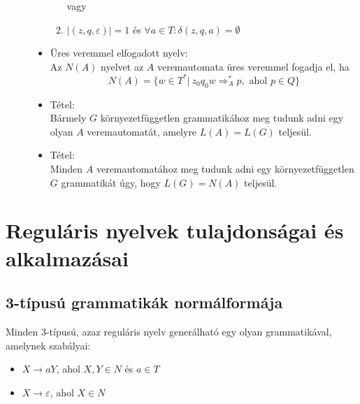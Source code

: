 \documentclass[margin=0px]{article}
\begin{document}
\begin{description}
\begin{itemize}
\begin{enumerate}
                            vagy
                      \item $|(z, q, \varepsilon)| = 1 $ és $\forall a \in T: \delta(z, q, a) = \emptyset$
                  \end{enumerate}
            \item Üres veremmel elfogadott nyelv: \\
                  Az $N(A)$ nyelvet az $A$ veremautomata üres veremmel fogadja el, ha
                  \[ N(A) = \{w \in T^* | \ z_0q_0w \Longrightarrow_A^* p, \textrm{ ahol } p \in Q \} \]
            \item Tétel: \\
                  Bármely $G$ környezetfüggetlen grammatikához meg tudunk adni egy olyan $A$ veremautomatát, amelyre $L(A) = L(G)$ teljesül.
            \item Tétel: \\
                  Minden $A$ veremautomatához meg tudunk adni egy környezetfüggetlen $G$ grammatikát úgy, hogy $L(G) = N(A)$ teljesül.
        \end{itemize}
\end{description}
\section{Reguláris nyelvek tulajdonságai és alkalmazásai}
\subsection{3-típusú grammatikák normálformája}
Minden 3-típusú, azaz reguláris nyelv generálható egy olyan grammatikával, amelynek szabályai:
\begin{itemize}
    \item $ X \rightarrow aY$, ahol $X,Y \in N$ és $a \in T$
    \item $X \rightarrow \varepsilon$, ahol $X \in N$
\end{itemize}
\end{document}
